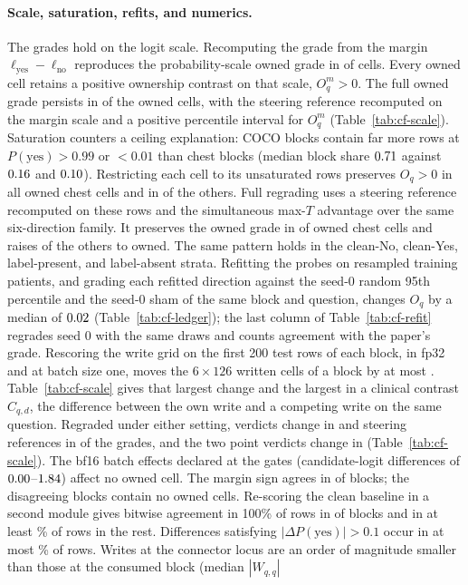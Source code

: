 \documentclass{article}
\begin{document}
\paragraph{Scale, saturation, refits, and numerics.} The grades hold on the logit scale. Recomputing the grade from the margin $\ell_{\mathrm{yes}}-\ell_{\mathrm{no}}$ reproduces the probability-scale owned grade in \cfScaleAgree{} of \cfScaleAgreeN{} cells. Every owned cell retains a positive ownership contrast on that scale, $O^m_q>0$. The full owned grade persists in \cfScaleOwnedKeepFull{} of the \cfScaleOwned{} owned cells, with the steering reference recomputed on the margin scale and a positive percentile interval for $O^m_q$ (Table~\ref{tab:cf-scale}). Saturation counters a ceiling explanation: COCO blocks contain far more rows at $P(\mathrm{yes})>0.99$ or $<0.01$ than chest blocks (median block share $0.71$ against $0.16$ and $0.10$). Restricting each cell to its unsaturated rows preserves $O_q>0$ in all \cfScaleUnsatOwned{} owned chest cells and in \cfScaleUnsatOtherPos{} of the \cfScaleUnsatOther{} others. Full regrading uses a steering reference recomputed on these rows and the simultaneous max-$T$ advantage over the same six-direction family. It preserves the owned grade in \cfScaleUnsatGradeKept{} of \cfScaleUnsatGradeN{} owned chest cells and raises \cfScaleUnsatGradeGained{} of the \cfScaleUnsatGradeOtherN{} others to owned. The same pattern holds in the clean-No, clean-Yes, label-present, and label-absent strata. Refitting the probes on resampled training patients, and grading each refitted direction against the seed-0 random 95th percentile and the seed-0 sham of the same block and question, changes $O_q$ by a median of $0.02$ (Table~\ref{tab:cf-ledger}); the last column of Table~\ref{tab:cf-refit} regrades seed 0 with the same draws and counts agreement with the paper's grade. Rescoring the write grid on the first 200 test rows of each block, in fp32 and at batch size one, moves the $6\times126$ written cells of a block by at most \cfPrecisionMaxDW{}. Table~\ref{tab:cf-scale} gives that largest change and the largest in a clinical contrast $C_{q,d}$, the difference between the own write and a competing write on the same question. Regraded under either setting, verdicts change in \cfPrecisionVerdictChanges{} and steering references in \cfPrecisionRefChanges{} of the \cfPrecisionGradeCells{} grades, and the two point verdicts change in \cfPrecisionPointVerdictChanges{} (Table~\ref{tab:cf-scale}). The bf16 batch effects declared at the gates (candidate-logit differences of $0.00$--$1.84$) affect no owned cell. The margin sign agrees in \cfScaleBatchAgree{} of \cfScaleBatchN{} blocks; the \cfScaleBatchDisagree{} disagreeing blocks contain no owned cells. Re-scoring the clean baseline in a second module gives bitwise agreement in 100\% of rows in \cfScaleBaselineIdentical{} of \cfScaleBaselineN{} blocks and in at least \cfScaleBaselineRestPct\% of rows in the rest. Differences satisfying $|\Delta P(\mathrm{yes})|>0.1$ occur in at most \cfScaleBaselineDpPct\% of rows. Writes at the connector locus are an order of magnitude smaller than those at the consumed block (median $|W_{q,q}|$ 
\end{document}
